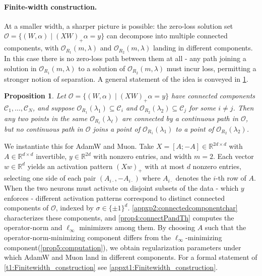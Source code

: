 \documentclass{article}
\newtheorem{proposition}{Proposition}[section]
\begin{document}
\paragraph{Finite-width construction.}
At a smaller width, a sharper picture is possible: the zero-loss solution set $\mathcal{O} = \{(W,\alpha) \mid (XW)_+\alpha = y\}$ can decompose into multiple connected components, with $\mathcal{O}_{R_1}(m,\lambda)$ and $\mathcal{O}_{R_2}(m,\lambda)$ landing in different components. In this case there is no zero-loss path between them at all - any path joining a solution in $\mathcal{O}_{R_1}(m,\lambda)$ to a solution of $\mathcal{O}_{R_2}(m,\lambda)$ must incur loss, permitting a stronger notion of separation. A general statement of the idea is conveyed in \cref{prop2:connectivity}.

\begin{proposition}
\label{prop2:connectivity}
Let $\mathcal{O}=\{(W,\alpha)\mid (XW)_+\alpha=y\}$ have connected components $\mathcal{C}_1,\ldots,\mathcal{C}_N$, and suppose $\mathcal{O}_{R_1}(\lambda_1) \subseteq \mathcal{C}_i$ and $\mathcal{O}_{R_2}(\lambda_2) \subseteq \mathcal{C}_j$ for some $i \neq j$. Then any two points in the same $\mathcal{O}_{R_\ell}(\lambda_\ell)$ are connected by a continuous path in $\mathcal{O}$, but no continuous path in $\mathcal{O}$ joins a point of $\mathcal{O}_{R_1}(\lambda_1)$ to a point of $\mathcal{O}_{R_2}(\lambda_2)$.
\end{proposition}

We instantiate this for AdamW and Muon. Take $X = [A; -A] \in \mathbb{R}^{2d \times d}$ with $A \in \mathbb{R}^{d \times d}$ invertible, $y \in \mathbb{R}^{2d}$ with nonzero entries, and width $m = 2$. Each vector $w \in \mathbb{R}^d$ yields an activation pattern $(Xw)_+$ with at most $d$ nonzero entries, selecting one side of each pair $(A_{i\cdot}, -A_{i\cdot})$ where $A_{i\cdot}$ denotes the $i$-th row of $A$. When the two neurons must activate on disjoint subsets of the data - which $y$ enforces - different activation patterns correspond to distinct connected components of $\mathcal{O}$, indexed by $\sigma \in \{\pm 1\}^d$. \cref{appxp2:connectedcomponentchar} characterizes these components, and \cref{prop4:connectPandTh} computes the operator-norm and $\ell_\infty$ minimizers among them. By choosing $A$ such that the operator-norm-minimizing component differs from the $\ell_\infty$-minimizing component(\cref{prop5:computation}), we obtain regularization parameters under which AdamW and Muon land in different components. For a formal statement of \cref{t1:Finitewidth_construction} see \cref{appxt1:Finitewidth_construction}.
\end{document}
